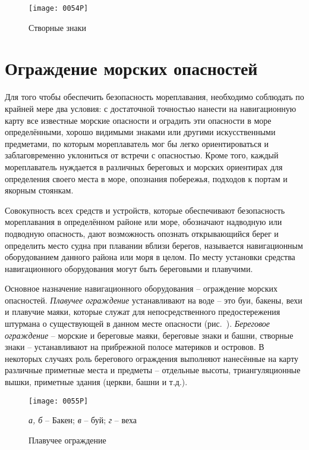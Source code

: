 \begin{figure}[htb]
  \centering{}
  \texttt{[image: 0054P]}
  \caption{Створные знаки}
  \label{fig:54}
\end{figure}

\section{Ограждение морских опасностей}

Для того чтобы обеспечить безопасность мореплавания, необходимо
соблюдать по крайней мере два условия: с достаточной точностью нанести
на навигационную карту все известные морские опасности и оградить эти
опасности в море определёнными, хорошо видимыми знаками или другими
искусственными предметами, по которым мореплаватель мог бы легко
ориентироваться и заблаговременно уклониться от встречи с
опасностью. Кроме того, каждый мореплаватель нуждается в различных
береговых и морских ориентирах для определения своего места в море,
опознания побережья, подходов к портам и якорным стоянкам.

Совокупность всех средств и устройств, которые обеспечивают
безопасность мореплавания в определённом районе или море, обозначают
надводную или подводную опасность, дают возможность опознать
открывающийся берег и определить место судна при плавании вблизи
берегов, называется навигационным оборудованием данного района или
моря в целом. По месту установки средства навигационного оборудования
могут быть береговыми и плавучими.

Основное назначение навигационного оборудования \--- ограждение
морских опасностей. \textit{Плавучее ограждение}
 устанавливают на воде \--- это буи,
бакены, вехи и плавучие маяки, которые служат для непосредственного
предостережения штурмана о существующей в данном месте опасности
(рис.~). \textit{Береговое ограждение}
 \--- морские и береговые маяки, береговые
знаки и башни, створные знаки \--- устанавливают на прибрежной полосе
материков и островов. В некоторых случаях роль берегового ограждения
выполняют нанесённые на карту различные приметные места и предметы
\--- отдельные высоты, триангуляционные вышки, приметные здания
(церкви, башни и т.д.).

\begin{figure}[htb]
  \centering{}
  \texttt{[image: 0055P]}
  \caption{Плавучее ограждение}
  \label{fig:55}
  \small
  \centering{}
  \textit{а, б} \--- Бакен; \textit{в} \--- буй; \textit{г} \--- веха
\end{figure}

